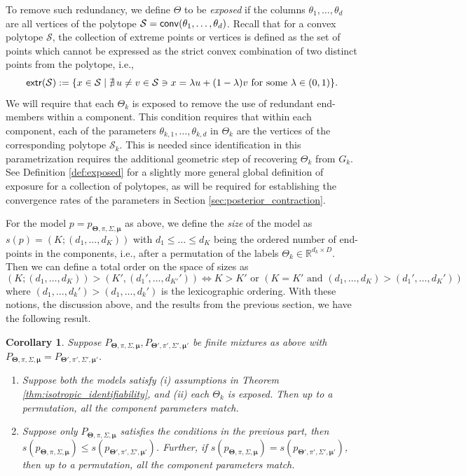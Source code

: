 \documentclass[bj,authoryear]{imsart}
\theoremstyle{plain}
\newtheorem{corollary}{Corollary}
\theoremstyle{remark}
\def\bTheta{{\boldsymbol\Theta}}
\def\bmu{{\boldsymbol\mu}}
\def\bbR{\mathbb{R}}
\def\cS{\mathcal{S}}
\def\conv{{\sf conv}}
\def\extr{{\sf extr }}
\def\bTheta{\boldsymbol{\Theta}}
\begin{document}
To remove such redundancy, we define $\Theta$ to be \textit{exposed} if the columns $\theta_1,\dots,\theta_d$ are all vertices of the polytope $\cS=\conv(\theta_1,\dots,\theta_d)$. Recall that for a convex polytope $\cS$, the collection of extreme points or vertices is defined as the set of points which cannot be expressed as the strict convex combination of two distinct points from the polytope, i.e., 
\begin{equation}\label{eq: vertices}
    \extr(\cS):=\{x\in\cS\mid \nexists \, u\neq v\in \cS \ni x = \lambda u + (1-\lambda)v \text{ for some } \lambda\in (0,1)\}.
\end{equation}
We will require that each $\Theta_k$ is exposed to remove the use of redundant end-members within a component. This condition requires that within each component, each of the parameters $\theta_{k,1},\dots,\theta_{k,d}$ in $\Theta_k$ are the vertices of the corresponding polytope $\cS_k$. This is needed since identification in this parametrization requires the additional geometric step of recovering $\Theta_k$ from $G_k$. See Definition \ref{def:exposed} for a slightly more general global definition of exposure for a collection of polytopes, as will be required for establishing the convergence rates of the parameters in Section \ref{sec:posterior_contraction}.

For the model $p=p_{\bTheta, \pi,\Sigma,\bmu}$ as above, we define the \textit{size} of the model as $s(p)=(K;(d_1,\dots,d_K))$ with $d_1\leq \dots\leq d_K$ being the ordered number of end-points in the components, i.e., after a permutation of the labels $\Theta_k\in\bbR^{d_k\times D}$. Then we can define a total order on the space of sizes as
$$(K;(d_1,\dots,d_K))>(K', (d_1',\dots,d_{K'}')) \iff K>K' \text{ or } \left(K=K'\text{ and } (d_1,\dots,d_K) > (d_1',\dots,d_K')\right)$$
where $(d_1,\dots,d_k')>(d_1,\dots,d_k')$ is the lexicographic ordering. With these notions, the discussion above, and the results from the previous section, we have the following result.

\begin{corollary}\label{cor: identifiability polytope}
    Suppose $P_{\bTheta,\pi,\Sigma, \bmu}, P_{\bTheta', \pi', \Sigma', \bmu'}$ be finite mixtures as above with $P_{\bTheta,\pi,\Sigma, \bmu}= P_{\bTheta', \pi', \Sigma', \bmu'}$.
    \begin{enumerate}
        \item Suppose \textit{both the models} satisfy (i) assumptions in Theorem \ref{thm:isotropic_identifiability}, and (ii) each $\Theta_k$ is exposed. Then up to a permutation, all the component parameters match.
        \item Suppose \textit{only } $P_{\bTheta,\pi,\Sigma,\bmu}$ satisfies the conditions in the previous part, then $s(p_{\bTheta,\pi,\Sigma,\bmu})\leq s(p_{\bTheta',\pi',\Sigma',\bmu'})$. Further, if $s(p_{\bTheta,\pi,\Sigma,\bmu})= s(p_{\bTheta',\pi',\Sigma',\bmu'})$, then up to a permutation, all the component parameters match.
    \end{enumerate}
\end{corollary}
\end{document}

